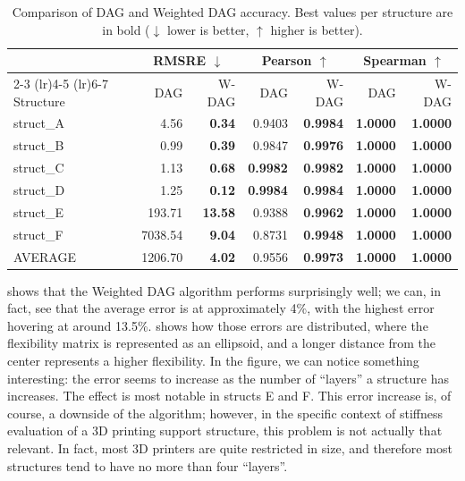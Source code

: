 \begin{table}[htbp]
  \centering
  \caption{Comparison of DAG and Weighted DAG accuracy. Best values per structure are in bold ($\downarrow$ lower is better, $\uparrow$ higher is better).}
  \label{tab:dag_performance}
  \begin{tabular}{lrrrrrr}
    \toprule
    & \multicolumn{2}{c}{RMSRE $\downarrow$} & \multicolumn{2}{c}{Pearson $\uparrow$} & \multicolumn{2}{c}{Spearman $\uparrow$} \\
    \cmidrule(lr){2-3} \cmidrule(lr){4-5} \cmidrule(lr){6-7}
    Structure & DAG & W-DAG & DAG & W-DAG & DAG & W-DAG \\
    \midrule
    struct\_A & 4.56    & \textbf{0.34}  & 0.9403          & \textbf{0.9984} & \textbf{1.0000} & \textbf{1.0000} \\
    struct\_B & 0.99    & \textbf{0.39}  & 0.9847          & \textbf{0.9976} & \textbf{1.0000} & \textbf{1.0000} \\
    struct\_C & 1.13    & \textbf{0.68}  & \textbf{0.9982} & \textbf{0.9982} & \textbf{1.0000} & \textbf{1.0000} \\
    struct\_D & 1.25    & \textbf{0.12}  & \textbf{0.9984} & \textbf{0.9984} & \textbf{1.0000} & \textbf{1.0000} \\
    struct\_E & 193.71  & \textbf{13.58} & 0.9388          & \textbf{0.9962} & \textbf{1.0000} & \textbf{1.0000} \\
    struct\_F & 7038.54 & \textbf{9.04}  & 0.8731          & \textbf{0.9948} & \textbf{1.0000} & \textbf{1.0000} \\
    \midrule
    AVERAGE   & 1206.70 & \textbf{4.02}  & 0.9556          & \textbf{0.9973} & \textbf{1.0000} & \textbf{1.0000} \\
    \bottomrule
  \end{tabular}
\end{table}


 shows that the Weighted DAG algorithm performs surprisingly well; we can, in fact, see that the average error is at approximately 4\%, with the highest error hovering at around 13.5\%.
 shows how those errors are distributed, where the flexibility matrix
is represented as an ellipsoid, and a longer distance from the center represents a higher flexibility.
In the figure, we can notice something interesting: the error seems to increase as the number of ``layers'' a structure has increases. The effect is most notable in structs E and F.
This error increase is, of course, a downside of the algorithm; however,
in the specific context of stiffness evaluation of a 3D printing support structure, this problem
is not actually that relevant. In fact, most 3D printers are quite restricted in size, and
therefore most structures tend to have no more than four ``layers''.


